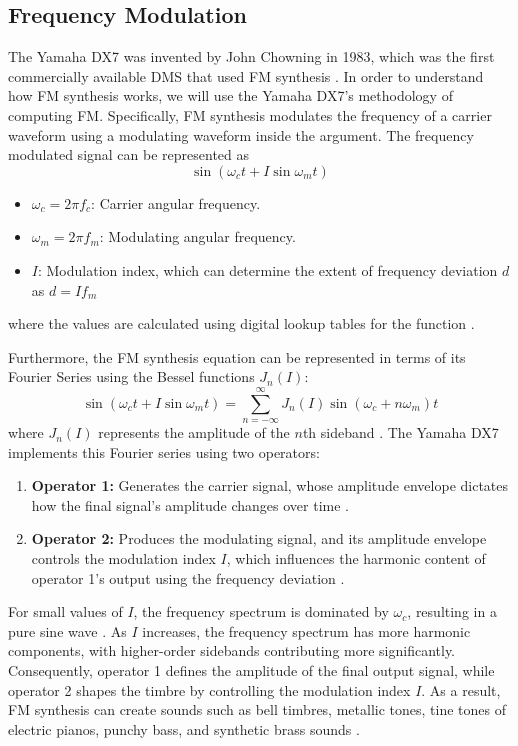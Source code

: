 \documentclass[12pt]{article}
\begin{document}
\subsection{Frequency Modulation}
The Yamaha DX7 was invented by John Chowning in 1983, which was the first commercially available DMS that used FM synthesis \cite{MAMO}. In order to understand how FM synthesis works, we will use the Yamaha DX7's methodology of computing FM. Specifically, FM synthesis modulates the frequency of a carrier waveform using a modulating waveform inside the argument. The frequency modulated signal can be represented as 
\begin{equation}
    \sin(\omega_c t + I \sin \omega_m t)
\end{equation}
\begin{itemize}
    \item \( \omega_c = 2\pi f_c \): Carrier angular frequency.
    \item \( \omega_m = 2\pi f_m \): Modulating angular frequency.
    \item \( I \): Modulation index, which can determine the extent of frequency deviation $d$ as $d=If_m$
\end{itemize}
where the values are calculated using digital lookup tables for the function \cite{MAMO}.
\vspace{1em}

Furthermore, the FM synthesis equation can be represented in terms of its Fourier Series using the Bessel functions $J_n(I)$:
    \begin{equation}
        \sin(\omega_c t + I \sin \omega_m t) = \sum_{n=-\infty}^\infty J_n(I) \sin(\omega_c + n\omega_m)t
    \end{equation}
where $J_n(I)$ represents the amplitude of the $n$th sideband \cite{MAMO}. The Yamaha DX7 implements this Fourier series using two operators:
\begin{enumerate}
    \item \textbf{Operator 1:} Generates the carrier signal, whose amplitude envelope dictates how the final signal's amplitude changes over time \cite{MAMO}. 
    \item \textbf{Operator 2:} Produces the modulating signal, and its amplitude envelope controls the modulation index $I$, which influences the harmonic content of operator 1's output using the frequency deviation \cite{MAMO}. 
\end{enumerate}

For small values of $I$, the frequency spectrum is dominated by $\omega_c$, resulting in a pure sine wave \cite{MAMO}. As $I$ increases, the frequency spectrum has more harmonic components, with higher-order sidebands contributing more significantly. Consequently, operator 1 defines the amplitude of the final output signal, while operator 2 shapes the timbre by controlling the modulation index $I$. As a result, FM synthesis can create sounds such as bell timbres, metallic tones, tine tones of electric pianos, punchy bass, and synthetic brass sounds \cite{OL}.
\end{document}
